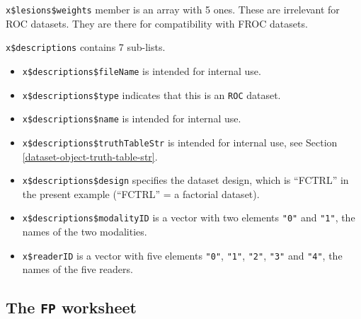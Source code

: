 \documentclass[
]{book}
\newenvironment{Shaded}{\begin{snugshade}}{\end{snugshade}}
\newcommand{\CommentTok}[1]{\textcolor[rgb]{0.56,0.35,0.01}{\textit{#1}}}
\newcommand{\FunctionTok}[1]{\textcolor[rgb]{0.00,0.00,0.00}{#1}}
\newcommand{\NormalTok}[1]{#1}
\newcommand{\SpecialCharTok}[1]{\textcolor[rgb]{0.00,0.00,0.00}{#1}}
\providecommand{\tightlist}{%
  \setlength{\itemsep}{0pt}\setlength{\parskip}{0pt}}
\begin{document}
\texttt{x\$lesions\$weights} member is an array with 5 ones. These are irrelevant for ROC datasets. They are there for compatibility with FROC datasets.

\texttt{x\$descriptions} contains 7 sub-lists.

\begin{Shaded}
\end{Shaded}

\begin{itemize}
\tightlist
\item
  \texttt{x\$descriptions\$fileName} is intended for internal use.
\item
  \texttt{x\$descriptions\$type} indicates that this is an \texttt{ROC} dataset.
\item
  \texttt{x\$descriptions\$name} is intended for internal use.
\item
  \texttt{x\$descriptions\$truthTableStr} is intended for internal use, see Section \ref{dataset-object-truth-table-str}.
\item
  \texttt{x\$descriptions\$design} specifies the dataset design, which is ``FCTRL'' in the present example (``FCTRL'' = a factorial dataset).
\item
  \texttt{x\$descriptions\$modalityID} is a vector with two elements \texttt{"0"} and \texttt{"1"}, the names of the two modalities.
\item
  \texttt{x\$readerID} is a vector with five elements \texttt{"0"}, \texttt{"1"}, \texttt{"2"}, \texttt{"3"} and \texttt{"4"}, the names of the five readers.
\end{itemize}

\hypertarget{dataset-object-details-read-datafile-correspondence-nl-fp}{%
\subsection{\texorpdfstring{The \texttt{FP} worksheet}{The FP worksheet}}\label{dataset-object-details-read-datafile-correspondence-nl-fp}}
\end{document}
